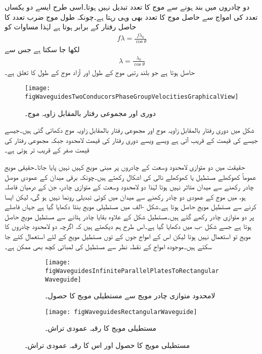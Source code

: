دو چادروں میں بند ہونے سے  موج کا تعدد تبدیل نہیں ہوتا۔اسی طرح ایسے دو یکساں تعدد کی امواج سے حاصل  موج کا تعدد بھی وہی رہتا ہے۔چونکہ طول موج ضرب تعدد کا حاصل رفتار کے برابر ہوتا ہے لہٰذا مساوات  کو
\begin{align*}
f \lambda=\frac{f \lambda_0}{\cos \theta}
\end{align*}
لکھا جا سکتا ہے جس سے
\begin{align*}
\lambda=\frac{\lambda_0}{\cos \theta}
\end{align*}
حاصل ہوتا ہے جو بلند رتبی موج کے طول  اور آزاد موج کے طول  کا تعلق ہے۔

\begin{figure}
\centering
\texttt{[image: figWaveguidesTwoConducorsPhaseGroupVelocitiesGraphicalView]}
\caption{دوری اور مجموعی رفتار بالمقابل زاویہ موج۔}
\label{شکل_مویج_دوری_مجموعی_رفتار_بالمقابل_زاویہ}
\end{figure} 

شکل  میں دوری رفتار بالمقابل زاویہ موج اور مجموعی رفتار بالمقابل زاویہ موج دکھائی گئی ہیں۔جیسے جیسے  کی قیمت  کے قریب آتی ہے ویسے ویسے دوری رفتار کی قیمت لامحدود جبکہ مجموعی رفتار کی قیمت صفر کے قریب تر ہوتی ہے۔

حقیقت میں دو متوازی لامحدود وسعت کے چادروں پر مبنی مویج کہیں نہیں پایا جاتا۔حقیقی مویج عموماً کھوکھلے مستطیل یا کھوکھلے نالی کی اشکال رکھتے ہیں۔چونکہ برقی میدان کے عمودی موصل چادر رکھنے سے میدان متاثر نہیں ہوتا لہٰذا دو لامحدود وسعت کے متوازی چادر، جن کے درمیان فاصلہ  ہو، میں  موج کے عمودی دو چادر رکھنے سے  میدان میں کوئی تبدیلی رونما نہیں ہو گی، لیکن ایسا کرنے سے مستطیل مویج حاصل ہوتا ہے۔شکل -الف میں مستطیلی مویج بنتا  دکھایا گیا ہے جہاں  فاصلے پر دو متوازی چادر رکھے گئے ہیں۔مستطیل شکل کے علاوہ بقایا چادر ہٹانے سے مستطیل مویج حاصل ہوتا ہے جسے شکل -ب میں دکھایا گیا ہے۔اس طرح ہم دیکھتے ہیں کہ اگرچہ دو لامحدود چادروں کا مویج تو استعمال نہیں ہوتا لیکن اس کے  امواج جوں کے توں مستطیل مویج کے لئے استعمال کئے جا سکتے ہیں۔موجودہ  امواج کے نقطہ نظر سے مستطیل کی  لمبائی کچھ بھی ممکن ہے۔

\begin{figure}
\centering
\begin{subfigure}{0.5\textwidth}
\centering
\texttt{[image: figWaveguidesInfiniteParallelPlatesToRectangularWaveguide]}
\caption{لامحدود متوازی چادر مویج سے مستطیلی مویج کا حصول۔}
\label{شکل_مویج_حصول_مستطیل}
\end{subfigure}%
%
\begin{subfigure}{0.5\textwidth}
\centering
\texttt{[image: figWaveguidesRectangularWaveguide]}
\caption{مستطیلی مویج کا رقبہ عمودی تراش۔}
\label{شکل_مویج_رقبہ_عمودی_تراش_مستطیل}
\end{subfigure}%
\caption{مستطیلی مویج کا حصول اور اس کا رقبہ عمودی تراش۔}
\label{شکل_مویج_مستطیل}
\end{figure}

